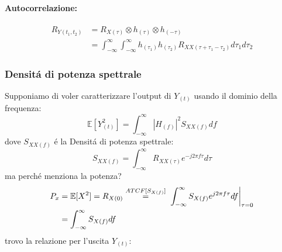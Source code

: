             \paragraph{Autocorrelazione:}
                \begin{align}
                    R_{Y(t_1,t_2)} &= R_{X(\tau)}\otimes h_{(\tau)} \otimes h_{(-\tau)} \nonumber \\
                                    &= \int_{-\infty}^{\infty}\int_{-\infty}^{\infty} h_{(\tau_1)}h_{(\tau_2)} R_{XX(\tau+\tau_1-\tau_2)} d\tau_1d\tau_2\nonumber
                \end{align}    
        \subsubsection{Densitá di potenza spettrale}\label{Densita di potenza spettrale}
            Supponiamo di voler caratterizzare l'output di $Y_{(t)}$ usando il dominio della frequenza:
            \[
                \mathbb{E}[Y_{(t)}^2] = \int_{-\infty}^{\infty} \left|H_{(f)}\right|^2 S_{XX(f)} df  
            \]
            dove $S_{XX(f)}$ é la Densitá di potenza spettrale:
            \[
                S_{XX(f)} = \int_{-\infty}^{\infty} R_{XX(\tau)} e^{-j2\pi f\tau}d\tau
            \]
            ma perché menziona la potenza?
            \begin{align}
                P_x &= \mathbb{E}[X^2] = R_{X(0)} \overset{ATCF[S_{X(f)}]}{=} \eval*{\int_{-\infty}^{\infty} S_{X(f)} e^{j2\pi f\tau}df}_{\tau=0} \nonumber \\
                    &=  \int_{-\infty}^{\infty} S_{X(f)}df \nonumber
            \end{align}
            trovo la relazione per l'uscita $Y_{(t)}$:
            \begin{figure}[H]
                \centering
            \end{figure}            
